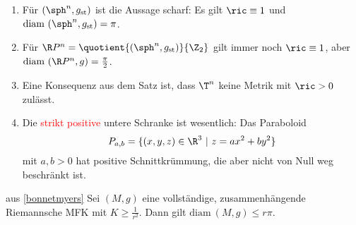 \begin{beispiele}
\begin{enumerate}
\item Für $(\sph^n, g_\text{st})$ ist die Aussage scharf: Es gilt $\ric \equiv 1$ und $\text{diam} \ (\sph^n, g_\text{st})=\pi$.
\item Für $\R P^n = \quotient{(\sph^n, g_\text{st})}{\Z_2}$ gilt immer noch $\ric \equiv 1$, aber $\text{diam} \ (\R P^n, g) = \frac{\pi}{2}$.
\item Eine Konsequenz aus dem Satz ist, dass $\T ^n$ keine Metrik mit $\ric > 0$ zulässt.
\item Die \textcolor{red}{strikt positive} untere Schranke ist wesentlich: Das Paraboloid
\begin{equation}
P_{a,b} = \{ (x,y,z) \in \R^3 \ | \ z = ax^2 + by^2 \}
\end{equation}
mit $a,b > 0$ hat positive Schnittkrümmung, die aber nicht von Null weg beschränkt ist.
\end{enumerate}
\end{beispiele}
\begin{korollar}{aus \ref{bonnetmyers}}{}
Sei $(M,g)$ eine vollständige, zusammenhängende Riemannsche MFK mit $K \geq \frac{1}{r^2}$. Dann gilt $\text{diam} \ (M,g) \leq r\pi$.
\end{korollar}
